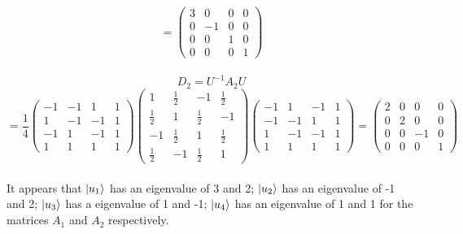 \begin{sol}
$$=\begin{pmatrix}3&0&0&0\\0&-1&0&0\\0&0&1&0\\0&0&0&1\end{pmatrix}$$\\
$$D_2=U^{-1}A_2U$$$$=\frac{1}{4}\begin{pmatrix}-1&-1&1&1\\1&-1&-1&1\\-1&1&-1&1\\1&1&1&1\end{pmatrix} \begin{pmatrix}1&\frac{1}{2}&-1&\frac{1}{2}\\\frac{1}{2}&1&\frac{1}{2}&-1\\-1&\frac{1}{2}&1&\frac{1}{2}\\\frac{1}{2}&-1&\frac{1}{2}&1\end{pmatrix}\begin{pmatrix}-1&1&-1&1\\-1&-1&1&1\\1&-1&-1&1\\1&1&1&1\end{pmatrix}=\begin{pmatrix}2&0&0&0\\0&2&0&0\\0&0&-1&0\\0&0&0&1\end{pmatrix}$$\\
It appears that $\ket{u_1}$ has an eigenvalue of 3 and 2; $\ket{u_2}$ has an eigenvalue of -1 and 2; $\ket{u_3}$ has a eigenvalue of 1 and -1; $\ket{u_4}$ has an eigenvalue of 1 and 1 for the matrices $A_1$ and $A_2$ respectively.
\end{sol}